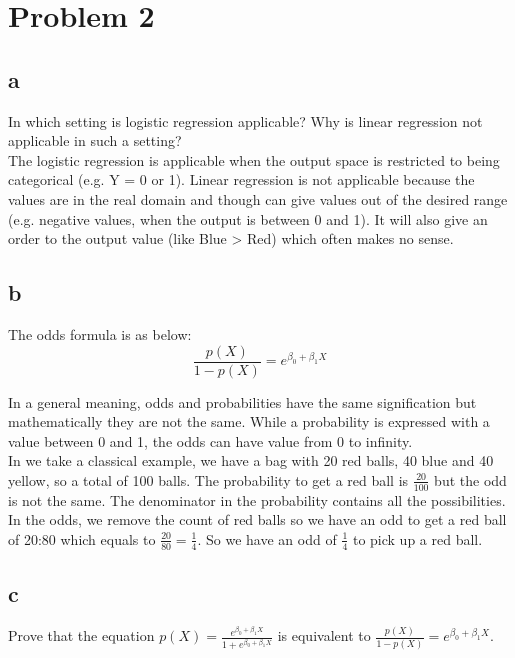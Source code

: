 \section*{Problem 2}

\subsection*{a}
In which setting is logistic regression applicable? Why is linear regression not applicable in such a setting?\\

The logistic regression is applicable when the output space is restricted to being categorical (e.g. Y = 0 or 1). Linear regression is not applicable because the values are in the real domain and though can give values out of the desired range (e.g. negative values, when the output is between 0 and 1). It will also give an order to the output value (like Blue > Red) which often makes no sense. 

\subsection*{b}
The odds formula is as below: 
\[ \frac{p(X)}{1 - p(X)} = e^{\beta_0 + \beta_1 X} \]

In a general meaning, odds and probabilities have the same signification but mathematically they are not the same. While a probability is expressed with a value between 0 and 1, the odds can have value from 0 to infinity. \\

In we take a classical example, we have a bag with 20 red balls, 40 blue and 40 yellow, so a total of 100 balls. The probability to get a red ball is $\frac{20}{100}$ but the odd is not the same. The denominator in the probability contains all the possibilities. In the odds, we remove the count of red balls so we have an odd to get a red ball of 20:80 which equals to $\frac{20}{80} = \frac{1}{4}$. So we have an odd of $\frac{1}{4}$ to pick up a red ball.  

\subsection*{c}

Prove that the equation $ p(X) = \frac{e^{\beta_0 + \beta_1 X}}{1 + e^{\beta_0 + \beta_1 X}} $ is equivalent to $\frac{p(X)}{1 - p(X)} = e^{\beta_0 + \beta_1 X}  $.\\

